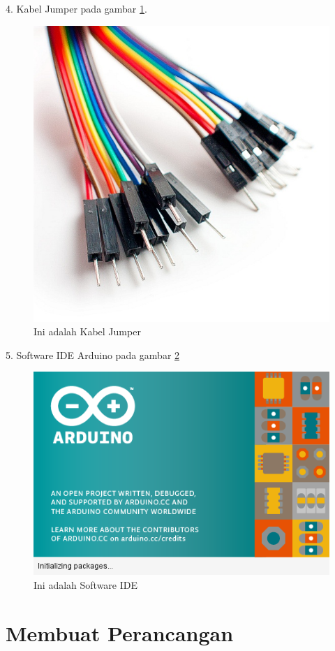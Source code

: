  4. Kabel Jumper pada gambar \ref{fig:jumper}.
  \begin{figure}[ht]
  \centerline{\includegraphics[width=.75\textwidth]{figures/jumper.jpg}}
  \caption{Ini adalah Kabel Jumper}
  \label{fig:jumper}
  \end{figure}

 5. Software IDE Arduino pada gambar \ref{fig:ide}
  \begin{figure}[ht]
  \centerline{\includegraphics[width=.75\textwidth]{figures/ide.png}}
  \caption{Ini adalah Software IDE}
  \label{fig:ide}
  \end{figure}

\section{Membuat Perancangan}

